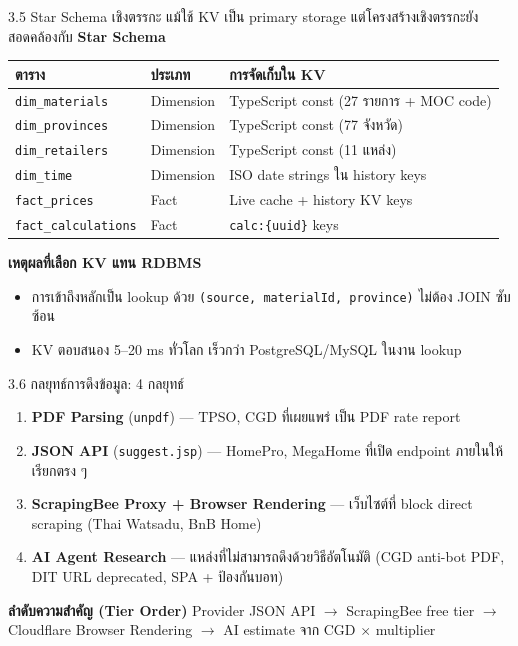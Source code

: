 \documentclass[aspectratio=169,11pt]{beamer}
\begin{document}
\begin{frame}{3.5 Star Schema เชิงตรรกะ}
  \footnotesize
  แม้ใช้ KV เป็น primary storage แต่โครงสร้างเชิงตรรกะยังสอดคล้องกับ
  \textbf{Star Schema}
  \begin{table}
    \centering
    \begin{tabularx}{\textwidth}{l l X}
      \toprule
      \textbf{ตาราง} & \textbf{ประเภท} & \textbf{การจัดเก็บใน KV} \\
      \midrule
      \texttt{dim\_materials}     & Dimension & TypeScript const (27 รายการ + MOC code) \\
      \texttt{dim\_provinces}     & Dimension & TypeScript const (77 จังหวัด) \\
      \texttt{dim\_retailers}     & Dimension & TypeScript const (11 แหล่ง) \\
      \texttt{dim\_time}          & Dimension & ISO date strings ใน history keys \\
      \texttt{fact\_prices}       & Fact      & Live cache + history KV keys \\
      \texttt{fact\_calculations} & Fact      & \texttt{calc:\{uuid\}} keys \\
      \bottomrule
    \end{tabularx}
  \end{table}
  \vspace{0.3em}
  \textbf{เหตุผลที่เลือก KV แทน RDBMS}
  \begin{itemize}
    \item การเข้าถึงหลักเป็น lookup ด้วย \texttt{(source, materialId, province)}
          ไม่ต้อง JOIN ซับซ้อน
    \item KV ตอบสนอง 5--20 ms ทั่วโลก เร็วกว่า PostgreSQL/MySQL ในงาน lookup
  \end{itemize}
\end{frame}

\begin{frame}{3.6 กลยุทธ์การดึงข้อมูล: 4 กลยุทธ์}
  \begin{enumerate}
    \item \textbf{PDF Parsing} (\texttt{unpdf}) --- TPSO, CGD ที่เผยแพร่
          เป็น PDF rate report
    \item \textbf{JSON API} (\texttt{suggest.jsp}) --- HomePro, MegaHome
          ที่เปิด endpoint ภายในให้เรียกตรง ๆ
    \item \textbf{ScrapingBee Proxy + Browser Rendering} --- เว็บไซต์ที่
          block direct scraping (Thai Watsadu, BnB Home)
    \item \textbf{AI Agent Research} --- แหล่งที่ไม่สามารถดึงด้วยวิธีอัตโนมัติ
          (CGD anti-bot PDF, DIT URL deprecated, SPA + ป้องกันบอท)
  \end{enumerate}
  \vspace{0.5em}
  \begin{block}{\textbf{ลำดับความสำคัญ (Tier Order)}}
    Provider JSON API $\to$ ScrapingBee free tier $\to$ Cloudflare Browser Rendering
    $\to$ AI estimate จาก CGD $\times$ multiplier
  \end{block}
\end{frame}
\end{document}
